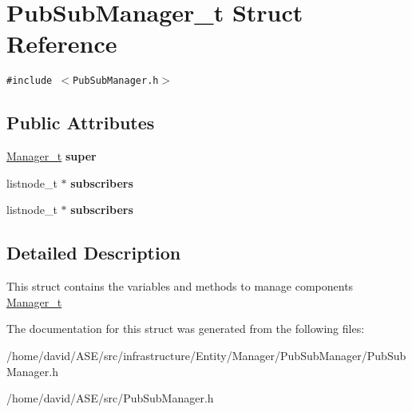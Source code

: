 \hypertarget{structPubSubManager__t}{
\section{PubSubManager\_\-t Struct Reference}
\label{structPubSubManager__t}
}
{\tt \#include $<$PubSubManager.h$>$}

\subsection*{Public Attributes}
\begin{CompactItemize}
\item 
\hypertarget{structPubSubManager__t_fc96ab80ee8e5005a82abead978b428e}{
\hyperlink{structManager__t}{Manager\_\-t} \textbf{super}}
\label{structPubSubManager__t_fc96ab80ee8e5005a82abead978b428e}

\item 
\hypertarget{structPubSubManager__t_845aae23a6609d056308fcf88a21333f}{
listnode\_\-t $\ast$ \textbf{subscribers}}
\label{structPubSubManager__t_845aae23a6609d056308fcf88a21333f}

\item 
\hypertarget{structPubSubManager__t_845aae23a6609d056308fcf88a21333f}{
listnode\_\-t $\ast$ \textbf{subscribers}}
\label{structPubSubManager__t_845aae23a6609d056308fcf88a21333f}

\end{CompactItemize}


\subsection{Detailed Description}
This struct contains the variables and methods to manage components  \hyperlink{structManager__t}{Manager\_\-t} 

The documentation for this struct was generated from the following files:\begin{CompactItemize}
\item 
/home/david/ASE/src/infrastructure/Entity/Manager/PubSubManager/PubSubManager.h\item 
/home/david/ASE/src/PubSubManager.h\end{CompactItemize}
